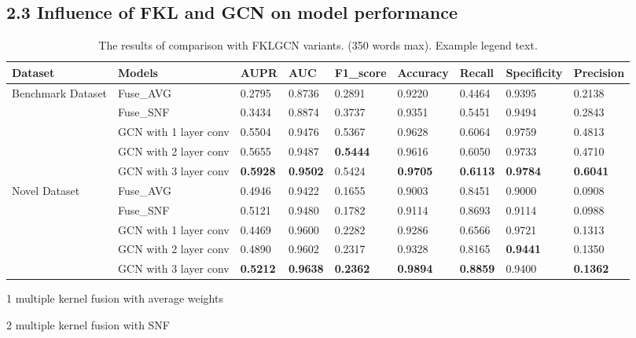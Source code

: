 \documentclass[fleqn,10pt]{wlscirep}
\begin{document}
\subsection*{2.3 Influence of FKL and GCN on model performance}
\begin{table}[ht]
\centering
 \caption{\label{tab:parameter1}The results of comparison with FKLGCN variants. (350 words max). Example legend text.}
\begin{threeparttable}[b]
\begin{tabular}{|l|l|l|l|l|l|l|l|l|}
\hline
Dataset & Models & AUPR & AUC &	F1_score & Accuracy	& Recall & Specificity & Precision\\
\hline
\multirow{4}{4em}{Benchmark Dataset} 
& Fuse_AVG\tnote{1} & 0.2795 & 0.8736 & 0.2891 & 0.9220 & 0.4464 & 0.9395 & 0.2138\\
& Fuse_SNF\tnote{2} & 0.3434	& 0.8874 & 0.3737	& 0.9351 & 0.5451	& 0.9494 & 0.2843\\
& GCN with 1 layer conv & 0.5504 & 0.9476 & 0.5367 & 0.9628 & 0.6064 & 0.9759 & 0.4813\\ 
& GCN with 2 layer conv & 0.5655 & 0.9487 & \bf{0.5444} & 0.9616 & 0.6050 & 0.9733 & 0.4710\\
& GCN with 3 layer conv& \bf{0.5928} & \bf{0.9502} & 0.5424 & \bf{0.9705} & \bf{0.6113} & \bf{0.9784} & \bf{0.6041}\\
\hline
\multirow{4}{4em}{Novel Dataset} 
& Fuse_AVG\tnote{1} & 0.4946 & 0.9422 & 0.1655 & 0.9003 & 0.8451 & 0.9000 & 0.0908\\
& Fuse_SNF\tnote{2} & 0.5121 & 0.9480 & 0.1782 & 0.9114 & 0.8693 & 0.9114	& 0.0988\\
& GCN with 1 layer conv & 0.4469 & 0.9600 & 0.2282 & 0.9286 & 0.6566 & 0.9721 & 0.1313\\ 
& GCN with 2 layer conv & 0.4890 & 0.9602 & 0.2317 & 0.9328 & 0.8165 & \bf{0.9441} & 0.1350\\
& GCN with 3 layer conv & \bf{0.5212} & \bf{0.9638} & \bf{0.2362} & \bf{0.9894} & \bf{0.8859} & 0.9400 & \bf{0.1362}\\
\hline
\end{tabular}
\begin{tablenotes}
     \item[1] multiple kernel fusion with average weights
     \item[2] multiple kernel fusion with SNF
     \end{tablenotes}
     \end{threeparttable}
\end{table}
\end{document}
